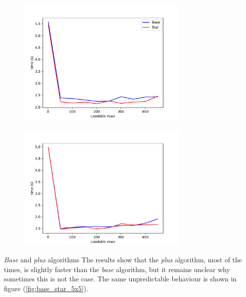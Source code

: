 \documentclass{beamer}
\begin{document}
\begin{frame}
    \begin{figure}
        \centering
        \includegraphics[width=0.75\textwidth]{loadable_rows_time_diff_rev.pdf}
        \label{fig:loadable_rows_time_diff_rev}
    \end{figure}
\end{frame}

\begin{frame}{}
    \begin{figure}
        \centering
        \includegraphics[width=0.75\textwidth]{loadable_rows_time_diff_shuffled.pdf}
        \label{fig:loadable_rows_time_diff_shuffled}
    \end{figure}
\end{frame}

\begin{frame}{\textit{Base} and \textit{plus} algorithms}
    The results show that the \textit{plus} algorithm, most of the times,
    is slightly faster than the \textit{base} algorithm, but it remains unclear
    why sometimes this is not the case.
    The same unpredictable behaviour is shown in figure (\ref{fig:base_star_5x5}).
\end{frame}
\end{document}
